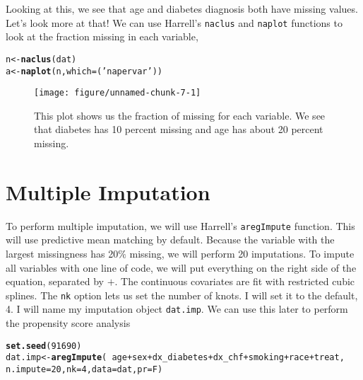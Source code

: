 \documentclass{article}\usepackage[]{graphicx}\usepackage[]{color}
\makeatletter
\def\maxwidth{ %
  \ifdim\Gin@nat@width>\linewidth
    \linewidth
  \else
    \Gin@nat@width
  \fi
}
\newcommand{\hlnum}[1]{\textcolor[rgb]{0.686,0.059,0.569}{#1}}%
\newcommand{\hlstr}[1]{\textcolor[rgb]{0.192,0.494,0.8}{#1}}%
\newcommand{\hlopt}[1]{\textcolor[rgb]{0,0,0}{#1}}%
\newcommand{\hlstd}[1]{\textcolor[rgb]{0.345,0.345,0.345}{#1}}%
\newcommand{\hlkwb}[1]{\textcolor[rgb]{0.69,0.353,0.396}{#1}}%
\newcommand{\hlkwc}[1]{\textcolor[rgb]{0.333,0.667,0.333}{#1}}%
\newcommand{\hlkwd}[1]{\textcolor[rgb]{0.737,0.353,0.396}{\textbf{#1}}}%
\newenvironment{kframe}{%
 \def\at@end@of@kframe{}%
 \ifinner\ifhmode%
  \def\at@end@of@kframe{\end{minipage}}%
  \begin{minipage}{\columnwidth}%
 \fi\fi%
 \def\FrameCommand##1{\hskip\@totalleftmargin \hskip-\fboxsep
 \colorbox{shadecolor}{##1}\hskip-\fboxsep
     \hskip-\linewidth \hskip-\@totalleftmargin \hskip\columnwidth}%
 \MakeFramed {\advance\hsize-\width
   \@totalleftmargin\z@ \linewidth\hsize
   \@setminipage}}%
 {\par\unskip\endMakeFramed%
 \at@end@of@kframe}
\newenvironment{knitrout}{}{} %
\makeatother
\begin{document}
Looking at this, we see that age and diabetes diagnosis both have missing values. Let's look more at that! We can use Harrell's \texttt{naclus} and \texttt{naplot} functions to look at the fraction missing in each variable,
\begin{knitrout}
\color{fgcolor}\begin{kframe}
\begin{alltt}
\hlstd{n}\hlkwb{<-}\hlkwd{naclus}\hlstd{(dat)}
\hlstd{a}\hlkwb{<-}\hlkwd{naplot}\hlstd{(n,} \hlkwc{which}\hlstd{=(}\hlstr{'na per var'}\hlstd{))}
\end{alltt}
\end{kframe}\begin{figure}[H]
\texttt{[image: figure/unnamed-chunk-7-1]} \caption[This plot shows us the fraction of missing for each variable]{This plot shows us the fraction of missing for each variable. We see that diabetes has 10 percent missing and age has about 20 percent missing.}\label{fig:unnamed-chunk-7}
\end{figure}


\end{knitrout}
\section*{Multiple Imputation}
To perform multiple imputation, we will use Harrell's \texttt{aregImpute} function. This will use predictive mean matching by default. Because the variable with the largest missingness has 20$\%$ missing, we will perform 20 imputations. To impute all variables with one line of code, we will put everything on the right side of the equation, separated by $+$. The continuous covariates are fit with restricted cubic splines. The \texttt{nk} option lets us set the number of knots. I will set it to the default, 4. I will name my imputation object \texttt{dat.imp}. We can use this later to perform the propensity score analysis
\begin{knitrout}
\color{fgcolor}\begin{kframe}
\begin{alltt}
\hlkwd{set.seed}\hlstd{(}\hlnum{91690}\hlstd{)}
\hlstd{dat.imp} \hlkwb{<-} \hlkwd{aregImpute}\hlstd{(}\hlopt{~}\hlstd{age} \hlopt{+} \hlstd{sex} \hlopt{+} \hlstd{dx_diabetes} \hlopt{+} \hlstd{dx_chf} \hlopt{+} \hlstd{smoking} \hlopt{+} \hlstd{race} \hlopt{+} \hlstd{treat,}
    \hlkwc{n.impute} \hlstd{=} \hlnum{20}\hlstd{,} \hlkwc{nk} \hlstd{=} \hlnum{4}\hlstd{,} \hlkwc{data} \hlstd{= dat,} \hlkwc{pr} \hlstd{= F)}
\end{alltt}
\end{kframe}
\end{knitrout}
\end{document}
